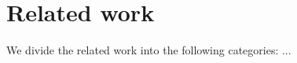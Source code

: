 \chapter{Related work}
\label{ch:related_work}
We divide the related work into the following categories:  ...

